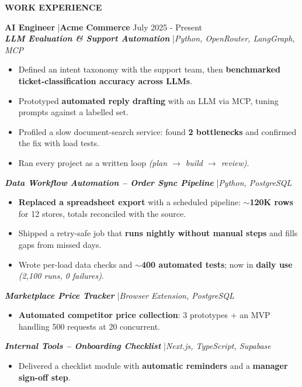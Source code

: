 \documentclass[10pt,a4paper]{article}
\newcommand{\cvsection}[1]{
    \vspace{1ex}
    \noindent\textbf{\large\color{cvblue} \uppercase{#1}} \textcolor{cvblue}{\hrulefill}\par
    \vspace{1ex}
}
\newcommand{\cvproject}[1]{\textcolor{cvblue}{\textbf{\textit{#1}}}}
\begin{document}
\cvsection{Work Experience}
\noindent\textbf{AI Engineer} \quad|\quad \textbf{Acme Commerce} \hfill July 2025 - Present\\
\vspace{-1mm}%
\cvproject{LLM Evaluation \& Support Automation} \quad|\quad \textit{Python, OpenRouter, LangGraph, MCP}
\begin{itemize}[leftmargin=*, itemsep=0.5mm, parsep=1pt]
    \item Defined an intent taxonomy with the support team, then \textbf{benchmarked ticket-classification accuracy across LLMs}.
    \item Prototyped \textbf{automated reply drafting} with an LLM via MCP, tuning prompts against a labelled set.
    \item Profiled a slow document-search service: found \textbf{2 bottlenecks} and confirmed the fix with load tests.
    \item Ran every project as a written loop \textit{(plan $\rightarrow$ build $\rightarrow$ review)}.
\end{itemize}
\vspace{-1mm}%
\cvproject{Data Workflow Automation -- Order Sync Pipeline} \quad|\quad \textit{Python, PostgreSQL}
\begin{itemize}[leftmargin=*, itemsep=0.5mm, parsep=1pt]
    \item \textbf{Replaced a spreadsheet export} with a scheduled pipeline: \textbf{$\sim$120K rows} for 12 stores, totals reconciled with the source.
    \item Shipped a retry-safe job that \textbf{runs nightly without manual steps} and fills gaps from missed days.
    \item Wrote per-load data checks and \textbf{$\sim$400 automated tests}; now in \textbf{daily use} \textit{(2,100 runs, 0 failures)}.
\end{itemize}
\vspace{-1mm}%
\cvproject{Marketplace Price Tracker} \quad|\quad \textit{Browser Extension, PostgreSQL}
\begin{itemize}[leftmargin=*, itemsep=0.5mm, parsep=1pt]
    \item \textbf{Automated competitor price collection}: 3 prototypes + an MVP handling 500 requests at 20 concurrent.
\end{itemize}
\vspace{-1mm}%
\cvproject{Internal Tools -- Onboarding Checklist} \quad|\quad \textit{Next.js, TypeScript, Supabase}
\begin{itemize}[leftmargin=*, itemsep=0.5mm, parsep=1pt]
    \item Delivered a checklist module with \textbf{automatic reminders} and a \textbf{manager sign-off step}.
\end{itemize}
\vspace{1mm}
\end{document}
